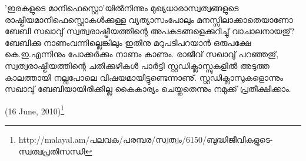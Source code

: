 'ഇരകളുടെ മാനിഫെസ്റ്റൊ'യില്‍നിന്നും മുഖ്യധാരാസ്വത്വങ്ങളുടെ രാഷ്ട്രീയമാനിഫെസ്റ്റൊകള്‍ക്കുള്ള വ്യത്യാസംപോലും 
മനസ്സിലാക്കാതെയാണോ ബേബി സഖാവു് സ്വത്വരാഷ്ട്രീയത്തിന്റെ അപകടങ്ങളെക്കുറിച്ചു് വാചാലനായതു്? ബേബിക്കു 
നാണംവന്നില്ലെങ്കിലും ഇതിനു മറുപടിപറയാന്‍ ഒരുപക്ഷേ കെ.ഇ.എന്നിനും പോക്കര്‍ക്കും നാണം കാണും. 
രാജീവ് സഖാവു് പറഞ്ഞതു്, സ്വത്വരാഷ്ട്രീയത്തിന്റെ ചതിക്കുഴികള്‍ പാര്‍ട്ടി സ്റ്റഡിക്ലാസ്സുകളില്‍ അടുത്ത 
കാലത്തായി നല്ലപോലെ വിഷയമായിട്ടുണ്ടെന്നാണു്. സ്റ്റഡിക്ലാസുകളൊന്നും സഖാവു് ബേബിയായിരിക്കില്ല കൈകാര്യം 
ചെയ്തതെന്നും നമുക്ക് പ്രതീക്ഷിക്കാം.

\hspace*{2em}(16 June, 2010)\footnote{http://malayal.am/പലവക/പരമ്പര/സ്വത്വം/6150/ബുദ്ധിജീവികളുടെ-സ്വത്വപ്രതിസന്ധി}

\newpage
